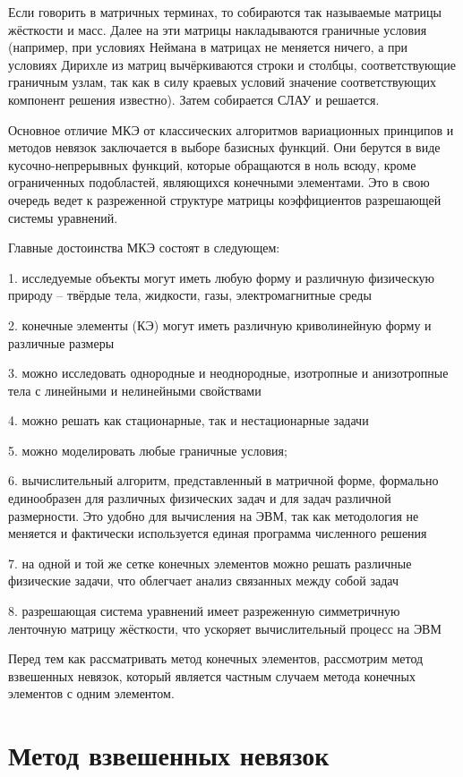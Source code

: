 \documentclass[14pt]{extreport}
\begin{document}
Если говорить в матричных терминах, то собираются так называемые матрицы жёсткости и масс. Далее на эти матрицы накладываются граничные условия (например, при условиях Неймана в матрицах не меняется ничего, а при условиях Дирихле из матриц вычёркиваются строки и столбцы, соответствующие граничным узлам, так как в силу краевых условий значение соответствующих компонент решения известно). Затем собирается СЛАУ и решается.

Основное отличие МКЭ от классических алгоритмов вариационных принципов и методов невязок заключается в выборе базисных функций. Они берутся в виде кусочно-непрерывных функций, которые обращаются в ноль всюду, кроме ограниченных подобластей, являющихся конечными элементами. Это в свою очередь ведет к разреженной структуре матрицы коэффициентов разрешающей системы уравнений.

Главные достоинства МКЭ состоят в следующем:

1. исследуемые объекты могут иметь любую форму и различную физическую природу – твёрдые тела, жидкости, газы, электромагнитные среды

2. конечные элементы (КЭ) могут иметь различную криволинейную форму и различные размеры

3. можно исследовать однородные и неоднородные, изотропные и анизотропные тела с линейными и нелинейными свойствами

4. можно решать как стационарные, так и нестационарные задачи

5. можно моделировать любые граничные условия;

6. вычислительный алгоритм, представленный в матричной форме, формально единообразен для различных физических задач и для задач различной размерности. Это удобно для вычисления на ЭВМ, так как методология не меняется и фактически используется единая программа численного решения

7. на одной и той же сетке конечных элементов можно решать различные физические задачи, что облегчает анализ связанных между собой задач

8. разрешающая система уравнений имеет разреженную симметричную ленточную матрицу жёсткости, что ускоряет вычислительный процесс на ЭВМ

Перед тем как рассматривать метод конечных элементов, рассмотрим метод взвешенных невязок, который является частным случаем метода конечных элементов с одним элементом.

\section{Метод взвешенных невязок}
\end{document}

